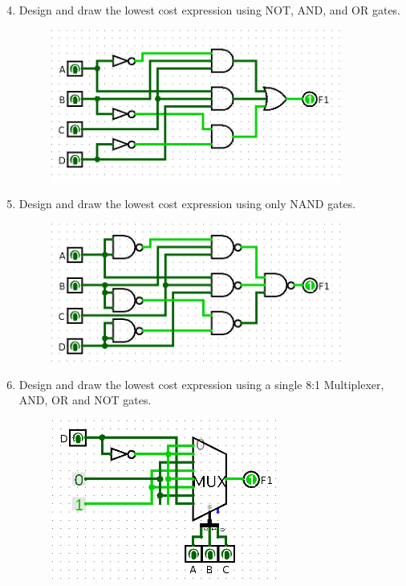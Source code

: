 \documentclass[pdftex,12pt,a4paper]{article}
\begin{document}
\begin{enumerate}[label=\alph*)]
  \setcounter{enumi}{3}
  \item Design and draw the lowest cost expression using NOT, AND, and OR gates.
	
  \begin{figure}[H]
    \centering
        \includegraphics[width=0.9\textwidth]{Prem1AND_OR.png}	
        \label{fig1}
   \end{figure}
   


  \item Design and draw the lowest cost expression using only NAND gates.

  \begin{figure}[H]
    \centering
        \includegraphics[width=0.9\textwidth]{Prem1NAND.png}	
        \label{fig1}
   \end{figure}

\newpage
  \item Design and draw the lowest cost expression using a single 8:1 Multiplexer, AND, OR and NOT gates.
	\begin{figure}[H]
    \centering
        \includegraphics[width=0.7\textwidth]{Prem1MUX.png}	
        \label{fig1}
   \end{figure}	

\end{enumerate}	
\end{document}
